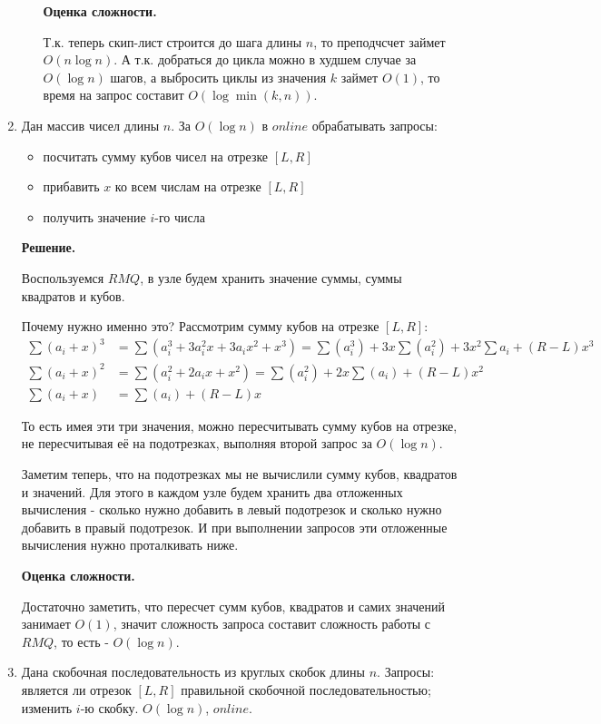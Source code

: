 \begin{enumerate}
\begin{itemize}
		\textbf{Оценка сложности.} 
		
		Т.к. теперь скип-лист строится до шага длины $n$, то преподчсчет займет $O(n \log n)$. 
		А т.к. добраться до цикла можно в худшем случае за $O(\log n )$ шагов, а выбросить 
		циклы из значения $k$ займет $O(1)$, то время на запрос составит $O(\log \min(k,n))$. 
	\end{itemize}
	
	\item Дан массив чисел длины $n$. За $O(\log n)$ в $online$ обрабатывать запросы:
	\begin{itemize}
		\item посчитать сумму кубов чисел на отрезке $[L, R]$
		\item прибавить $x$ ко всем числам на отрезке $[L, R]$
		\item получить значение $i$-го числа
	\end{itemize}
	
	\textbf{Решение.}
	
	Воспользуемся $RMQ$, в узле будем хранить значение суммы, суммы квадратов и кубов.
	
	Почему нужно именно это? Рассмотрим сумму кубов на отрезке $[L, R]$:
	\begin{align*}
	\sum (a_i + x)^3 &= \sum (a_i^3 + 3a_i^2x + 3a_ix^2 + x^3) = \sum (a_i^3) + 3x\sum(a_i^2) + 3x^2\sum a_i + (R-L)x^3 \\
	\sum (a_i + x)^2 &= \sum (a_i^2 + 2a_ix + x^2) = \sum (a_i^2) + 2x\sum(a_i) + (R-L)x^2\\
	\sum (a_i + x) &= \sum(a_i) + (R-L)x
	\end{align*}
	
	То есть имея эти три значения, можно пересчитывать сумму кубов на отрезке, не пересчитывая 
	её на подотрезках, выполняя второй запрос за $O(\log n)$. 
	
	Заметим теперь, что на подотрезках мы не вычислили сумму кубов, квадратов и значений. Для 
	этого в каждом узле будем хранить два отложенных вычисления - сколько нужно добавить в 
	левый подотрезок и сколько нужно добавить в правый подотрезок. И при выполнении запросов эти отложенные 
	вычисления нужно проталкивать ниже. 
	
	\textbf{Оценка сложности.} 
	
	Достаточно заметить, что пересчет сумм кубов, квадратов и самих значений занимает $O(1)$, значит сложность 
	запроса составит сложность работы с $RMQ$, то есть - $O(\log n)$.
	
	\item Дана скобочная последовательность из круглых скобок длины $n$. Запросы: является ли 
	отрезок $[L, R]$ правильной скобочной последовательностью; изменить $i$-ю скобку. $O(\log 
	n)$, $online$.
	

\end{enumerate}
